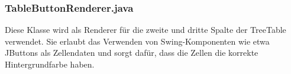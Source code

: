 \subsubsection*{TableButtonRenderer.java}
Diese Klasse wird als Renderer für die zweite und dritte Spalte der TreeTable verwendet. Sie erlaubt das Verwenden von Swing-Komponenten wie etwa JButtons als Zellendaten und sorgt dafür, dass die Zellen die korrekte Hintergrundfarbe haben.


